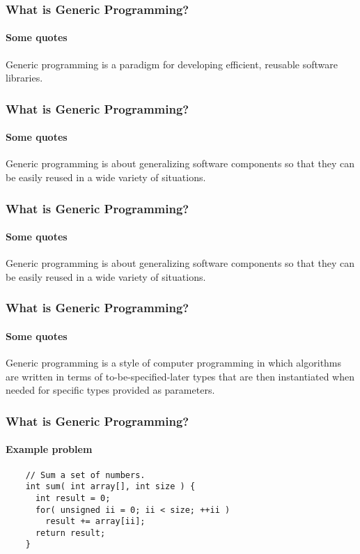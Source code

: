 \begin{frame}
  \frametitle{What is Generic Programming?}
  \framesubtitle{Some quotes}
  \begin{block}{}
  {\Large Generic programming is a paradigm for developing efficient, reusable
    software libraries.}
  \end{block}
\end{frame}

\begin{frame}
  \frametitle{What is Generic Programming?}
  \framesubtitle{Some quotes}
  \begin{block}{}
    {\Large Generic programming is about generalizing software components
      so that they can be easily reused in a wide variety of situations.}
  \end{block}
\end{frame}

\begin{frame}
  \frametitle{What is Generic Programming?}
  \framesubtitle{Some quotes}
  \begin{block}{}
    {\Large Generic programming is about generalizing software components
      so that they can be easily reused in a wide variety of situations.}
  \end{block}
\end{frame}

\begin{frame}
  \frametitle{What is Generic Programming?}
  \framesubtitle{Some quotes}
  \begin{block}{}
    {\Large Generic programming is a style of computer programming
      in which algorithms are written in terms of to-be-specified-later
      types that are then instantiated when needed for specific types
      provided as parameters.}
  \end{block}
\end{frame}

\begin{frame}[fragile]
  \frametitle{What is Generic Programming?}
  \framesubtitle{Example problem}
  \begin{example}
    \begin{lstlisting}
    // Sum a set of numbers.
    int sum( int array[], int size ) {
      int result = 0;
      for( unsigned ii = 0; ii < size; ++ii )
        result += array[ii];
      return result;
    }
    \end{lstlisting}
  \end{example}
\end{frame}

